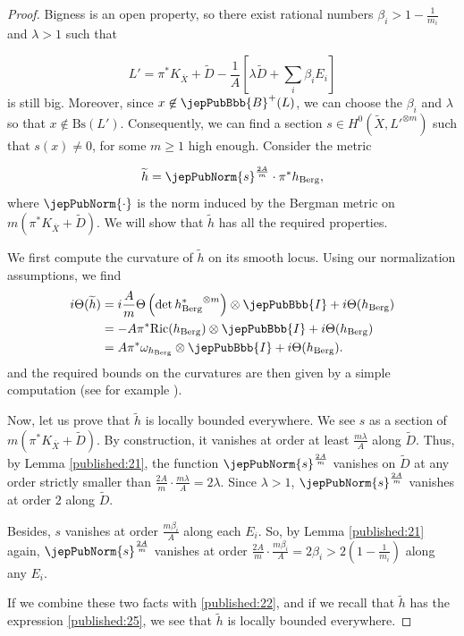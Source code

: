 \begin{proof}
Bigness is an open property, so there exist rational numbers $\beta_i > 1 - \frac{1}{m_i}$ and $\lambda > 1$ such that 

$$
L' = \pi^\ast K_{\overline{X}} + \widetilde{D} - \frac{1}{A} \left[ \lambda \widetilde{D} + \sum_i \beta_i E_i \right]
$$
is still big. Moreover, since $x \not\in \jepPubBbb{B}^+ (L)$, we can choose the $\beta_i$ and $\lambda$ so that $x \not\in \mathrm{Bs}(L')$. Consequently, we can find a section $s \in H^0(\widetilde{X}, L'^{\otimes m})$ such that $s(x) \neq 0$, for some $m \geqslant 1$ high enough. Consider the metric 

\begin{equation} \label{published:25}
\widetilde{h} = \jepPubNorm{s}^{\frac{2 A}{m}}\cdot \pi^\ast h_{\mathrm{Berg}},
\end{equation} 
where $\jepPubNorm{\cdot}$ is the norm induced by the Bergman metric on $m ( \pi^\ast K_{\overline{X}} + \widetilde{D} )$. We will show that $\widetilde{h}$ has all the required properties.

We first compute the curvature of $\widetilde{h}$ on its smooth locus. Using our normalization assumptions, we find
\begin{align*}
i \Theta(\widetilde{h}) & = i \frac{A}{m} \Theta \left( \det {h^\ast_{\mathrm{Berg}}}^{\otimes m} \right) \otimes \jepPubBbb{I} + i \Theta(h_{\mathrm{Berg}}) \\
	& = - A \pi^\ast \mathrm{Ric} (h_{\mathrm{Berg}}) \otimes \jepPubBbb{I}+ i \Theta(h_{\mathrm{Berg}}) \\
	& =  A \pi^\ast \omega_{h_{\mathrm{Berg}}}  \otimes \jepPubBbb{I}+ i \Theta(h_{\mathrm{Berg}}).
\end{align*}
and the required bounds on the curvatures are then given by a simple computation (see for example \cite{pubref06}). 

Now, let us prove that $\widetilde{h}$ is locally bounded everywhere. We see $s$ as a section of $m( \pi^\ast K_{\overline{X}} + \widetilde{D})$. By construction, it vanishes at order at least $\frac{m \lambda}{A}$ along $\widetilde{D}$. Thus, by Lemma \ref{published:21}, the function $\jepPubNorm{s}^{\frac{2A}{m}}$ vanishes on $\widetilde{D}$ at any order strictly smaller than $\frac{2 A}{m} \cdot \frac{m\lambda}{A} = 2 \lambda$. Since $\lambda > 1$, $\jepPubNorm{s}^{\frac{2 A}{m}}$ vanishes at order $2$ along $\widetilde{D}$.

Besides, $s$ vanishes at order $\frac{m \beta_i}{A}$ along each $E_i$. So, by Lemma \ref{published:21} again, $\jepPubNorm{s}^{\frac{2A}{m}}$ vanishes at order $\frac{2A}{m} \cdot \frac{m \beta_i}{A} = 2 \beta_i > 2 \left( 1 - \frac{1}{m_i} \right)$ along any $E_i$. 

If we combine these two facts with \eqref{published:22}, and if we recall that $\widetilde{h}$ has the expression \eqref{published:25}, we see that $\widetilde{h}$ is locally bounded everywhere.
\end{proof}


